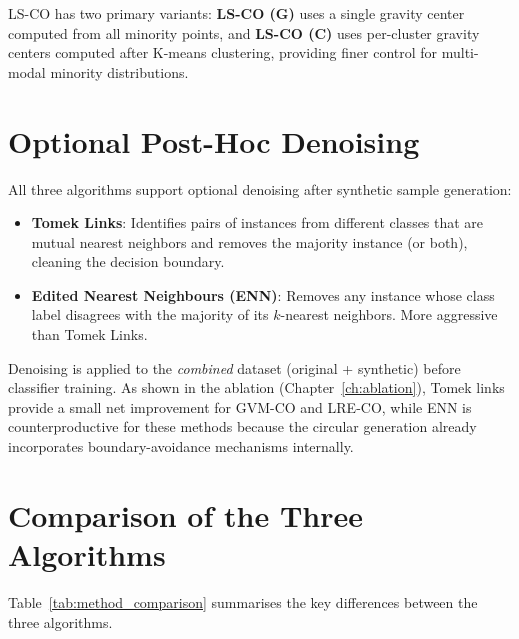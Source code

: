 LS-CO has two primary variants: \textbf{LS-CO (G)} uses a single gravity center computed from all minority points, and \textbf{LS-CO (C)} uses per-cluster gravity centers computed after K-means clustering, providing finer control for multi-modal minority distributions.


\section{Optional Post-Hoc Denoising}
\label{sec:methods:denoising}

All three algorithms support optional denoising after synthetic sample generation:

\begin{itemize}[leftmargin=*]
    \item \textbf{Tomek Links}: Identifies pairs of instances from different classes that are mutual nearest neighbors and removes the majority instance (or both), cleaning the decision boundary.
    \item \textbf{Edited Nearest Neighbours (ENN)}: Removes any instance whose class label disagrees with the majority of its $k$-nearest neighbors. More aggressive than Tomek Links.
\end{itemize}

Denoising is applied to the \emph{combined} dataset (original + synthetic) before classifier training.
As shown in the ablation (Chapter~\ref{ch:ablation}), Tomek links provide a small net improvement for GVM-CO and LRE-CO, while ENN is counterproductive for these methods because the circular generation already incorporates boundary-avoidance mechanisms internally.


\section{Comparison of the Three Algorithms}
\label{sec:methods:comparison}

Table~\ref{tab:method_comparison} summarises the key differences between the three algorithms.

